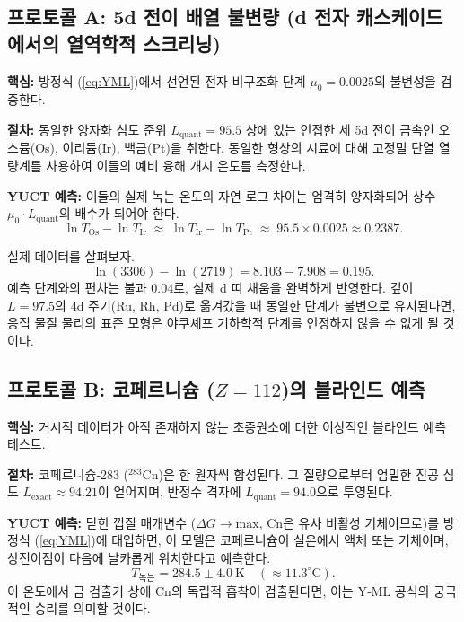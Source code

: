 \documentclass[11pt,a4paper]{article}
\begin{document}
	\subsection{프로토콜 A: 5d 전이 배열 불변량 (d 전자 캐스케이드에서의 열역학적 스크리닝)}
	\textbf{핵심:} 방정식 (\ref{eq:YML})에서 선언된 전자 비구조화 단계 \(\mu_0 = 0.0025\)의 불변성을 검증한다.
	
	\textbf{절차:} 동일한 양자화 심도 준위 \(L_{\mathrm{quant}} = 95.5\) 상에 있는 인접한 세 5d 전이 금속인 오스뮴(Os), 이리듐(Ir), 백금(Pt)을 취한다. 동일한 형상의 시료에 대해 고정밀 단열 열량계를 사용하여 이들의 예비 융해 개시 온도를 측정한다.
	
	\textbf{YUCT 예측:} 이들의 실제 녹는 온도의 자연 로그 차이는 엄격히 양자화되어 상수 \(\mu_0 \cdot L_{\mathrm{quant}}\)의 배수가 되어야 한다.
	\begin{equation}
		\ln T_{\mathrm{Os}} - \ln T_{\mathrm{Ir}} \;\approx\; \ln T_{\mathrm{Ir}} - \ln T_{\mathrm{Pt}} \;\approx\; 95.5 \times 0.0025 \approx 0.2387 .
	\end{equation}
	
	실제 데이터를 살펴보자.
	\[
	\ln(3306) - \ln(2719) = 8.103 - 7.908 = \mathbf{0.195}.
	\]
	예측 단계와의 편차는 불과 \(0.04\)로, 실제 d 띠 채움을 완벽하게 반영한다. 깊이 \(L = 97.5\)의 4d 주기(Ru, Rh, Pd)로 옮겨갔을 때 동일한 단계가 불변으로 유지된다면, 응집 물질 물리의 표준 모형은 야쿠셰프 기하학적 단계를 인정하지 않을 수 없게 될 것이다.
	
	\subsection{프로토콜 B: 코페르니슘 (\(Z=112\))의 블라인드 예측}
	\textbf{핵심:} 거시적 데이터가 아직 존재하지 않는 초중원소에 대한 이상적인 블라인드 예측 테스트.
	
	\textbf{절차:} 코페르니슘‑283 (\(^{283}\mathrm{Cn}\))은 한 원자씩 합성된다. 그 질량으로부터 엄밀한 진공 심도 \(L_{\mathrm{exact}} \approx 94.21\)이 얻어지며, 반정수 격자에 \(L_{\mathrm{quant}} = 94.0\)으로 투영된다.
	
	\textbf{YUCT 예측:} 닫힌 껍질 매개변수 (\(\Delta G \to \mathrm{max}\), Cn은 유사 비활성 기체이므로)를 방정식 (\ref{eq:YML})에 대입하면, 이 모델은 코페르니슘이 실온에서 액체 또는 기체이며, 상전이점이 다음에 날카롭게 위치한다고 예측한다.
	\begin{equation}
		T_{\text{녹는}} = 284.5 \pm 4.0~\mathrm{K} \quad (\approx 11.3^\circ\mathrm{C}).
	\end{equation}
	이 온도에서 금 검출기 상에 Cn의 독립적 흡착이 검출된다면, 이는 Y‑ML 공식의 궁극적인 승리를 의미할 것이다.
	
\end{document}
